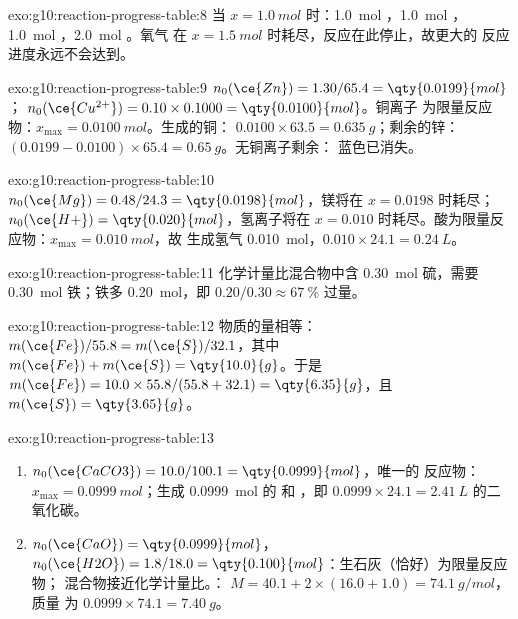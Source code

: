 \begin{solution}{exo:g10:reaction-progress-table:8}
当 $x = \qty{1.0}{mol}$ 时：\qty{1.0}{mol} ，\qty{1.0}{mol}
，\qty{1.0}{mol} ，\qty{2.0}{mol} 。氧气
在 $x = \qty{1.5}{mol}$ 时耗尽，反应在此停止，故更大的
反应进度永远不会达到。
\end{solution}

\begin{solution}{exo:g10:reaction-progress-table:9}
$n_0(\ce{Zn}) = 1.30 / 65.4 = \qty{0.0199}{mol}$；
$n_0(\ce{Cu^{2+}}) = 0.10 \times 0.1000 = \qty{0.0100}{mol}$。铜离子
为限量反应物：$x_{\max} = \qty{0.0100}{mol}$。生成的铜：
$0.0100 \times 63.5 = \qty{0.635}{g}$；剩余的锌：
$(0.0199 - 0.0100) \times 65.4 = \qty{0.65}{g}$。无铜离子剩余：
蓝色已消失。
\end{solution}

\begin{solution}{exo:g10:reaction-progress-table:10}
$n_0(\ce{Mg}) = 0.48 / 24.3 = \qty{0.0198}{mol}$，镁将在
$x = 0.0198$ 时耗尽；$n_0(\ce{H+}) = \qty{0.020}{mol}$，氢离子将在
$x = 0.010$ 时耗尽。酸为限量反应物：$x_{\max} = \qty{0.010}{mol}$，故
生成氢气 \qty{0.010}{mol}，$0.010 \times 24.1 = \qty{0.24}{L}$。
\end{solution}

\begin{solution}{exo:g10:reaction-progress-table:11}
化学计量比混合物中含 \qty{0.30}{mol} 硫，需要
\qty{0.30}{mol} 铁；铁多 \qty{0.20}{mol}，即
$0.20 / 0.30 \approx \qty{67}{\percent}$ 过量。
\end{solution}

\begin{solution}{exo:g10:reaction-progress-table:12}
物质的量相等：$m(\ce{Fe})/55.8 = m(\ce{S})/32.1$，其中
$m(\ce{Fe}) + m(\ce{S}) = \qty{10.0}{g}$。于是
$m(\ce{Fe}) = 10.0 \times 55.8 / (55.8 + 32.1) = \qty{6.35}{g}$，且
$m(\ce{S}) = \qty{3.65}{g}$。
\end{solution}

\begin{solution}{exo:g10:reaction-progress-table:13}
\begin{enumerate}
  \item $n_0(\ce{CaCO3}) = 10.0 / 100.1 = \qty{0.0999}{mol}$，唯一的
        反应物：$x_{\max} = \qty{0.0999}{mol}$；生成
        \qty{0.0999}{mol} 的  和 ，即
        $0.0999 \times 24.1 = \qty{2.41}{L}$ 的二氧化碳。
  \item $n_0(\ce{CaO}) = \qty{0.0999}{mol}$，$n_0(\ce{H2O}) = 1.8 / 18.0
        = \qty{0.100}{mol}$：生石灰（恰好）为限量反应物；
        混合物接近化学计量比。：
        $M = 40.1 + 2 \times (16.0 + 1.0) = \qty{74.1}{g/mol}$，质量
        为 $0.0999 \times 74.1 = \qty{7.40}{g}$。
\end{enumerate}
\end{solution}

